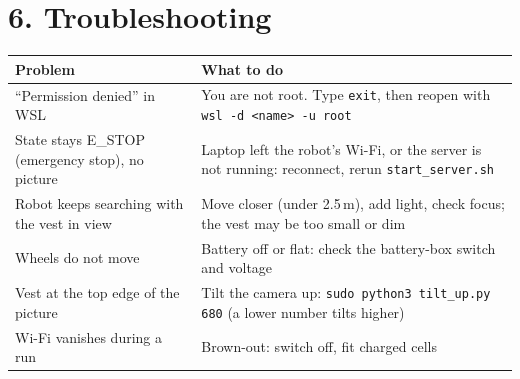 \documentclass[10pt]{article}
\begin{document}
\section{6. Troubleshooting}
\begin{tabularx}{\linewidth}{>{\raggedright\arraybackslash}p{5.2cm} X}
\toprule
\textbf{Problem} & \textbf{What to do} \\
\midrule
``Permission denied'' in WSL & You are not root. Type \texttt{exit}, then reopen with \texttt{wsl -d <name> -u root} \\
State stays E\_STOP (emergency stop), no picture & Laptop left the robot's Wi-Fi, or the server is not running: reconnect, rerun \texttt{start\_server.sh} \\
Robot keeps searching with the vest in view & Move closer (under 2.5\,m), add light, check focus; the vest may be too small or dim \\
Wheels do not move & Battery off or flat: check the battery-box switch and voltage \\
Vest at the top edge of the picture & Tilt the camera up: \texttt{sudo python3 tilt\_up.py 680} (a lower number tilts higher) \\
Wi-Fi vanishes during a run & Brown-out: switch off, fit charged cells \\
\bottomrule
\end{tabularx}
\end{document}
